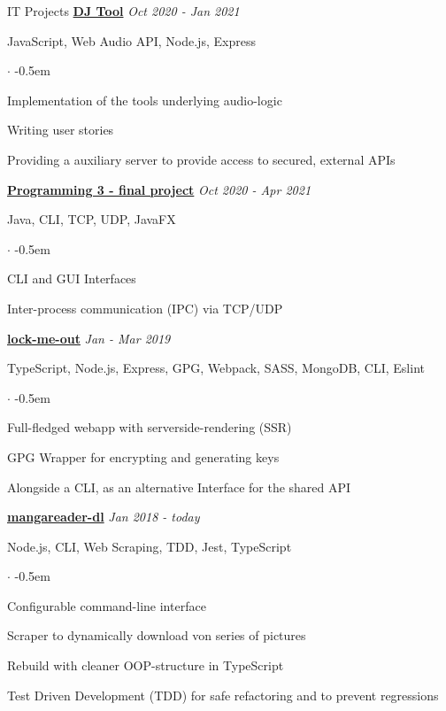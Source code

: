 \documentclass{cv}
\begin{document}
\begin{rSection}{IT Projects}
  \textbf{\href{https://github.com/vyvytn/avt}{DJ Tool}}
  \hfill
  {\em Oct 2020 - Jan 2021}

  JavaScript, Web Audio API, Node.js, Express
  \begin{list}{$\cdot$}{}
    \itemsep -0.5em \vspace{-0.5em}
    \smallskip
    \item Implementation of the tools underlying audio-logic
    \item Writing user stories
    \item Providing a auxiliary server to provide access to secured, external APIs
  \end{list}

  \textbf{\href{https://github.com/jneidel/htw-prog3}{Programming 3 - final project}}
  \hfill
  {\em Oct 2020 - Apr 2021}

  Java, CLI, TCP, UDP, JavaFX
  \begin{list}{$\cdot$}{}
    \itemsep -0.5em \vspace{-0.5em}
    \smallskip
    \item CLI and GUI Interfaces
    \item Inter-process communication (IPC) via TCP/UDP
  \end{list}

  \textbf{\href{https://github.com/jneidel/lock-me-out}{lock-me-out}}
  \hfill
  {\em Jan - Mar 2019}

  TypeScript, Node.js, Express, GPG, Webpack, SASS, MongoDB, CLI, Eslint
  \begin{list}{$\cdot$}{}
    \itemsep -0.5em \vspace{-0.5em}
    \smallskip
    \item Full-fledged webapp with serverside-rendering (SSR)
    \item GPG Wrapper for encrypting and generating keys
    \item Alongside a CLI, as an alternative Interface for the shared API
  \end{list}

  \textbf{\href{https://github.com/jneidel/mangareader-dl}{mangareader-dl}}
  \hfill
  {\em Jan 2018 - today}

  Node.js, CLI, Web Scraping, TDD, Jest, TypeScript
  \begin{list}{$\cdot$}{}
    \itemsep -0.5em \vspace{-0.5em}
    \smallskip
    \item Configurable command-line interface
    \item Scraper to dynamically download von series of pictures
    \item Rebuild with cleaner OOP-structure in TypeScript
    \item Test Driven Development (TDD) for safe refactoring and to prevent regressions
  \end{list}


\end{rSection}
\end{document}

